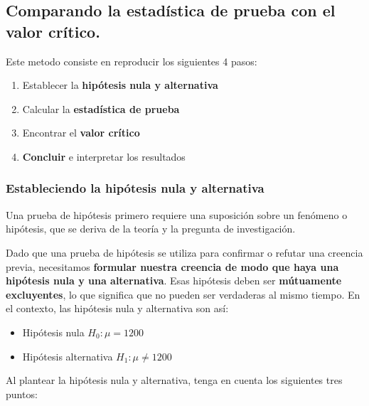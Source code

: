 \documentclass[
]{book}
\providecommand{\tightlist}{%
  \setlength{\itemsep}{0pt}\setlength{\parskip}{0pt}}
\begin{document}
\hypertarget{comparando-la-estaduxedstica-de-prueba-con-el-valor-cruxedtico.}{%
\subsection{\texorpdfstring{Comparando la estadística de prueba con el \textbf{valor crítico}.}{Comparando la estadística de prueba con el valor crítico.}}\label{comparando-la-estaduxedstica-de-prueba-con-el-valor-cruxedtico.}}

Este metodo consiste en reproducir los siguientes 4 pasos:

\begin{enumerate}
\def\labelenumi{\arabic{enumi}.}
\tightlist
\item
  Establecer la \textbf{hipótesis nula y alternativa}
\item
  Calcular la \textbf{estadística de prueba}
\item
  Encontrar el \textbf{valor crítico}
\item
  \textbf{Concluir} e interpretar los resultados
\end{enumerate}

\hypertarget{estableciendo-la-hipuxf3tesis-nula-y-alternativa}{%
\subsubsection{Estableciendo la hipótesis nula y alternativa}\label{estableciendo-la-hipuxf3tesis-nula-y-alternativa}}

Una prueba de hipótesis primero requiere una suposición sobre un fenómeno o hipótesis, que se deriva de la teoría y la pregunta de investigación.

Dado que una prueba de hipótesis se utiliza para confirmar o refutar una creencia previa, necesitamos \textbf{formular nuestra creencia de modo que haya una hipótesis nula y una alternativa}. Esas hipótesis deben ser \textbf{mútuamente excluyentes}, lo que significa que no pueden ser verdaderas al mismo tiempo. En el contexto, las hipótesis nula y alternativa son así:

\begin{itemize}
\tightlist
\item
  Hipótesis nula \(H_0:\mu=1200\)
\item
  Hipótesis alternativa \(H_1:\mu\ne 1200\)
\end{itemize}

Al plantear la hipótesis nula y alternativa, tenga en cuenta los siguientes tres puntos:
\end{document}
